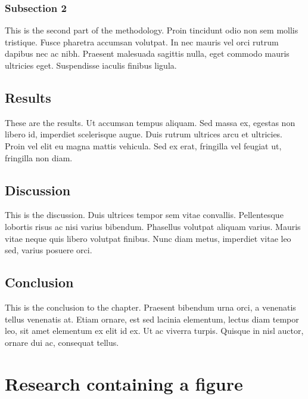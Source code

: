 \documentclass[12pt,a4paper,]{report}
\begin{document}
\hypertarget{subsection-2}{%
\subsection{Subsection 2}\label{subsection-2}}

This is the second part of the methodology. Proin tincidunt odio non sem
mollis tristique. Fusce pharetra accumsan volutpat. In nec mauris vel
orci rutrum dapibus nec ac nibh. Praesent malesuada sagittis nulla, eget
commodo mauris ultricies eget. Suspendisse iaculis finibus ligula.

\hypertarget{results}{%
\section{Results}\label{results}}

These are the results. Ut accumsan tempus aliquam. Sed massa ex, egestas
non libero id, imperdiet scelerisque augue. Duis rutrum ultrices arcu et
ultricies. Proin vel elit eu magna mattis vehicula. Sed ex erat,
fringilla vel feugiat ut, fringilla non diam.

\hypertarget{discussion}{%
\section{Discussion}\label{discussion}}

This is the discussion. Duis ultrices tempor sem vitae convallis.
Pellentesque lobortis risus ac nisi varius bibendum. Phasellus volutpat
aliquam varius. Mauris vitae neque quis libero volutpat finibus. Nunc
diam metus, imperdiet vitae leo sed, varius posuere orci.

\hypertarget{conclusion-1}{%
\section{Conclusion}\label{conclusion-1}}

This is the conclusion to the chapter. Praesent bibendum urna orci, a
venenatis tellus venenatis at. Etiam ornare, est sed lacinia elementum,
lectus diam tempor leo, sit amet elementum ex elit id ex. Ut ac viverra
turpis. Quisque in nisl auctor, ornare dui ac, consequat tellus.

\hypertarget{research-containing-a-figure}{%
\chapter{Research containing a
figure}\label{research-containing-a-figure}}
\end{document}
